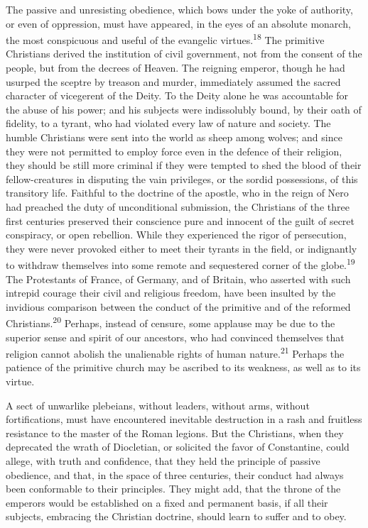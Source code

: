 
The passive and unresisting obedience, which bows under the yoke of
authority, or even of oppression, must have appeared, in the eyes of an
absolute monarch, the most conspicuous and useful of the evangelic
virtues.\textsuperscript{18} The primitive Christians derived the institution of civil
government, not from the consent of the people, but from the decrees of
Heaven. The reigning emperor, though he had usurped the sceptre by
treason and murder, immediately assumed the sacred character of
vicegerent of the Deity. To the Deity alone he was accountable for the
abuse of his power; and his subjects were indissolubly bound, by their
oath of fidelity, to a tyrant, who had violated every law of nature and
society. The humble Christians were sent into the world as sheep among
wolves; and since they were not permitted to employ force even in the
defence of their religion, they should be still more criminal if they
were tempted to shed the blood of their fellow-creatures in disputing
the vain privileges, or the sordid possessions, of this transitory
life. Faithful to the doctrine of the apostle, who in the reign of Nero
had preached the duty of unconditional submission, the Christians of
the three first centuries preserved their conscience pure and innocent
of the guilt of secret conspiracy, or open rebellion. While they
experienced the rigor of persecution, they were never provoked either
to meet their tyrants in the field, or indignantly to withdraw
themselves into some remote and sequestered corner of the globe.\textsuperscript{19} The
Protestants of France, of Germany, and of Britain, who asserted with
such intrepid courage their civil and religious freedom, have been
insulted by the invidious comparison between the conduct of the
primitive and of the reformed Christians.\textsuperscript{20} Perhaps, instead of
censure, some applause may be due to the superior sense and spirit of
our ancestors, who had convinced themselves that religion cannot
abolish the unalienable rights of human nature.\textsuperscript{21} Perhaps the patience
of the primitive church may be ascribed to its weakness, as well as to
its virtue.

A sect of unwarlike plebeians, without leaders, without arms, without
fortifications, must have encountered inevitable destruction in a rash
and fruitless resistance to the master of the Roman legions. But the
Christians, when they deprecated the wrath of Diocletian, or solicited
the favor of Constantine, could allege, with truth and confidence, that
they held the principle of passive obedience, and that, in the space of
three centuries, their conduct had always been conformable to their
principles. They might add, that the throne of the emperors would be
established on a fixed and permanent basis, if all their subjects,
embracing the Christian doctrine, should learn to suffer and to obey.

